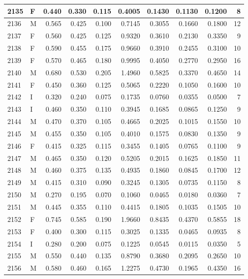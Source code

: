 \documentclass[9pt,twocolumn,twoside,]{pnas-new}
\begin{document}
\begin{tabular}{l|l|r|r|r|r|r|r|r|r}
\hline
2135 & F & 0.440 & 0.330 & 0.115 & 0.4005 & 0.1430 & 0.1130 & 0.1200 & 8\\
\hline
2136 & M & 0.565 & 0.425 & 0.100 & 0.7145 & 0.3055 & 0.1660 & 0.1800 & 12\\
\hline
2137 & F & 0.560 & 0.425 & 0.125 & 0.9320 & 0.3610 & 0.2130 & 0.3350 & 9\\
\hline
2138 & F & 0.590 & 0.455 & 0.175 & 0.9660 & 0.3910 & 0.2455 & 0.3100 & 10\\
\hline
2139 & F & 0.570 & 0.465 & 0.180 & 0.9995 & 0.4050 & 0.2770 & 0.2950 & 16\\
\hline
2140 & M & 0.680 & 0.530 & 0.205 & 1.4960 & 0.5825 & 0.3370 & 0.4650 & 14\\
\hline
2141 & F & 0.450 & 0.360 & 0.125 & 0.5065 & 0.2220 & 0.1050 & 0.1600 & 10\\
\hline
2142 & I & 0.320 & 0.240 & 0.075 & 0.1735 & 0.0760 & 0.0355 & 0.0500 & 7\\
\hline
2143 & I & 0.460 & 0.350 & 0.110 & 0.3945 & 0.1685 & 0.0865 & 0.1250 & 9\\
\hline
2144 & M & 0.470 & 0.370 & 0.105 & 0.4665 & 0.2025 & 0.1015 & 0.1550 & 10\\
\hline
2145 & M & 0.455 & 0.350 & 0.105 & 0.4010 & 0.1575 & 0.0830 & 0.1350 & 9\\
\hline
2146 & F & 0.415 & 0.325 & 0.115 & 0.3455 & 0.1405 & 0.0765 & 0.1100 & 9\\
\hline
2147 & M & 0.465 & 0.350 & 0.120 & 0.5205 & 0.2015 & 0.1625 & 0.1850 & 11\\
\hline
2148 & M & 0.460 & 0.375 & 0.135 & 0.4935 & 0.1860 & 0.0845 & 0.1700 & 12\\
\hline
2149 & M & 0.415 & 0.310 & 0.090 & 0.3245 & 0.1305 & 0.0735 & 0.1150 & 8\\
\hline
2150 & M & 0.270 & 0.195 & 0.070 & 0.1060 & 0.0465 & 0.0180 & 0.0360 & 7\\
\hline
2151 & M & 0.445 & 0.355 & 0.110 & 0.4415 & 0.1805 & 0.1035 & 0.1505 & 10\\
\hline
2152 & F & 0.745 & 0.585 & 0.190 & 1.9660 & 0.8435 & 0.4370 & 0.5855 & 18\\
\hline
2153 & F & 0.400 & 0.300 & 0.115 & 0.3025 & 0.1335 & 0.0465 & 0.0935 & 8\\
\hline
2154 & I & 0.280 & 0.200 & 0.075 & 0.1225 & 0.0545 & 0.0115 & 0.0350 & 5\\
\hline
2155 & M & 0.550 & 0.440 & 0.135 & 0.8790 & 0.3680 & 0.2095 & 0.2650 & 10\\
\hline
2156 & M & 0.580 & 0.460 & 0.165 & 1.2275 & 0.4730 & 0.1965 & 0.4350 & 16\\

\end{tabular}
\end{document}
